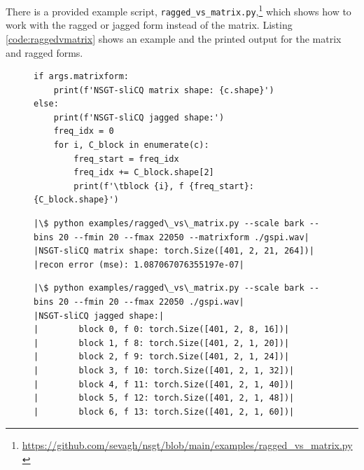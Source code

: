 \documentclass[report.tex]{subfiles}
\begin{document}
There is a provided example script, \Verb#ragged_vs_matrix.py#,\footnote{\url{https://github.com/sevagh/nsgt/blob/main/examples/ragged_vs_matrix.py}} which shows how to work with the ragged or jagged form instead of the matrix. Listing \ref{code:raggedvmatrix} shows an example and the printed output for the matrix and ragged forms.

\begin{figure}[h]
  \centering
 \begin{minipage}{\textwidth}
  \centering
\setlength\partopsep{-\topsep}
\begin{verbatim}
if args.matrixform:
    print(f'NSGT-sliCQ matrix shape: {c.shape}')
else:
    print(f'NSGT-sliCQ jagged shape:')
    freq_idx = 0
    for i, C_block in enumerate(c):
        freq_start = freq_idx
        freq_idx += C_block.shape[2]
        print(f'\tblock {i}, f {freq_start}: {C_block.shape}')
\end{verbatim}
 \vspace{1em}
 \end{minipage}
 \begin{minipage}{\textwidth}
  \centering
\begin{verbatim}
|\$ python examples/ragged\_vs\_matrix.py --scale bark --bins 20 --fmin 20 --fmax 22050 --matrixform ./gspi.wav|
|NSGT-sliCQ matrix shape: torch.Size([401, 2, 21, 264])|
|recon error (mse): 1.087067076355197e-07|
\end{verbatim}
 \vspace{1em}
 \end{minipage}
\begin{minipage}{\textwidth}
  \centering
\begin{verbatim}
|\$ python examples/ragged\_vs\_matrix.py --scale bark --bins 20 --fmin 20 --fmax 22050 ./gspi.wav|
|NSGT-sliCQ jagged shape:|
|        block 0, f 0: torch.Size([401, 2, 8, 16])|
|        block 1, f 8: torch.Size([401, 2, 1, 20])|
|        block 2, f 9: torch.Size([401, 2, 1, 24])|
|        block 3, f 10: torch.Size([401, 2, 1, 32])|
|        block 4, f 11: torch.Size([401, 2, 1, 40])|
|        block 5, f 12: torch.Size([401, 2, 1, 48])|
|        block 6, f 13: torch.Size([401, 2, 1, 60])|

\end{verbatim}
\end{minipage}
\end{figure}
\end{document}
